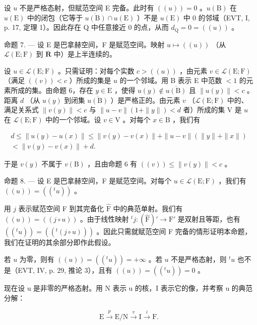 设 \(u\) 不是严格态射，但赋范空间 E 完备。此时有 \(((u)) = 0\) 。\(u(\mathrm{B})\) 在 \(u(\mathrm{E})\) 中的闭包（它等于 \(\overline{u(\mathrm{B})} \cap u(\mathrm{E})\) ）不是 \(u(\mathrm{E})\) 中 0 的邻域（EVT, I, p. 17, 定理 1）。因此存在 Q 中任意接近 0 的点，从而 \(d_{\mathrm{Q}} = 0 = ((u))\) 。

命题 7. --- 设 E 是巴拿赫空间，F 是赋范空间。映射 \(u \mapsto ((u))\) （从 \(\mathcal{L}(\mathrm{E};\mathrm{F})\) 到 \(\overline{\mathbf{R}}\) 中）是上半连续的。

设 \(u \in \mathcal{L}(\mathrm{E};\mathrm{F})\) 。只需证明：对每个实数 \(c > ((u))\) ，由元素 \(v \in \mathcal{L}(\mathrm{E};\mathrm{F})\) （满足 \(((v)) < c\) ）所成的集是 \(u\) 的一个邻域。用 B 表示 E 中范数 \(< 1\) 的元素所成的集。由命题 6，存在 \(y \in \mathrm{E}\) ，使得 \(u(y) \notin \overline{u(\mathrm{B})}\) 且 \(\| u(y)\| < c\) 。距离 \(d\) （从 \(u(y)\) 到闭集 \(\overline{u(\mathrm{B})}\) ）是严格正的。由元素 \(v\) （\(\mathcal{L}(\mathrm{E};\mathrm{F})\) 中的、满足关系式 \(\| v(y)\| < c\) 与 \(\| u - v\|(1 + \| y\|) < d\) 者）所成的集 V 是 \(u\) 在 \(\mathcal{L}(\mathrm{E};\mathrm{F})\) 中的一个邻域。设 \(v \in \mathrm{V}\) 。对每个 \(x \in \mathrm{B}\) ，我们有

\[
\begin{array}{c} d \leqslant \| u (y) - u (x) \| \leqslant \| v (y) - v (x) \| + \| u - v \| (\| y \| + \| x \|) \\ <   \| v (y) - v (x) \| + d. \end{array}
\]

于是 \(v(y)\) 不属于 \(v(\mathrm{B})\) ，且由命题 6 有 \(((v)) \leqslant \| v(y) \| < c\) 。

命题 8. --- 设 E 是巴拿赫空间，F 是赋范空间。对每个 \(u \in \mathcal{L}(\mathrm{E};\mathrm{F})\) ，我们有 \(((u)) = ((^t u))\) 。

用 \(j\) 表示赋范空间 F 到其完备化 \(\widehat{\mathrm{F}}\) 中的典范单射。我们有 \(((u)) = ((j \circ u))\) 。由于线性映射 \(^t j: (\widehat{\mathrm{F}})' \to \mathrm{F}'\) 是双射且等距，也有 \(((^t u)) = ((^t (j \circ u)))\) 。因此只需就赋范空间 F 完备的情形证明本命题，我们在证明的其余部分即作此假设。

若 \(u\) 为零，则有 \(((u)) = ((^t u)) = +\infty\) 。若 \(u\) 不是严格态射，则 \(^t u\) 也不是（EVT, IV, p. 29, 推论 3），且有 \(((u)) = ((^t u)) = 0\) 。

现在设 u 是非零的严格态射。用 N 表示 u 的核，I 表示它的像，并考察 u 的典范分解：

\[
\mathrm{E} \xrightarrow {p} \mathrm{E/N} \xrightarrow {v} \mathrm{I} \xrightarrow {i} \mathrm{F}.
\]

